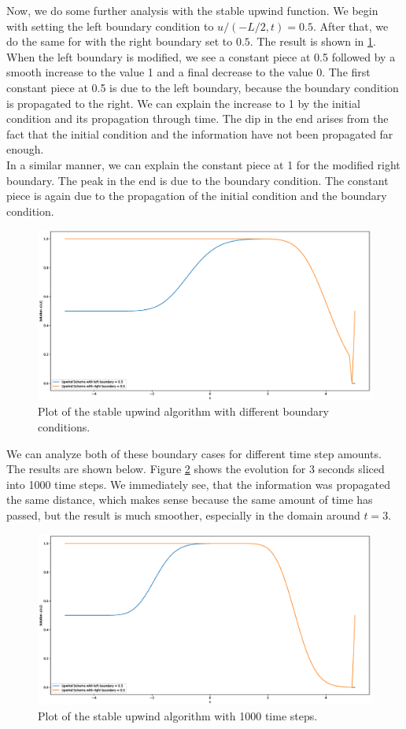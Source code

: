 \documentclass{scrartcl}
\begin{document}
Now, we do some further analysis with the stable upwind function. We begin with setting the left boundary condition to \( u/(-L/2, t) = 0.5 \). After that, we do the same for with the right boundary set to \(0.5\). The result is shown in \ref{fig:upwindbounds}. \\
When the left boundary is modified, we see a constant piece at 0.5 followed by a smooth increase to the value 1 and a final decrease to the value 0. The first constant piece at 0.5 is due to the left boundary, because the boundary condition is propagated to the right. We can explain the increase to 1 by the initial condition and its propagation through time. The dip in the end arises from the fact that the initial condition and the information have not been propagated far enough. \\
In a similar manner, we can explain the constant piece at 1 for the modified right boundary. The peak in the end is due to the boundary condition. The constant piece is again due to the propagation of the initial condition and the boundary condition.
\begin{figure}[H]
	\centering
	\includegraphics[width=0.9\linewidth]{Plots/upwind_bounds}
	\caption{Plot of the stable upwind algorithm with different boundary conditions.}
	\label{fig:upwindbounds}
\end{figure}
We can analyze both of these boundary cases for different time step amounts. The results are shown below. Figure \ref{fig:upwindt1000} shows the evolution for 3 seconds sliced into 1000 time steps. We immediately see, that the information was propagated the same distance, which makes sense because the same amount of time has passed, but the result is much smoother, especially in the domain around \( t = 3 \).
\begin{figure}[H]
	\centering
	\includegraphics[width=0.9\linewidth]{Plots/upwind_t1000}
	\caption{Plot of the stable upwind algorithm with 1000 time steps.}
	\label{fig:upwindt1000}
\end{figure}
\end{document}
